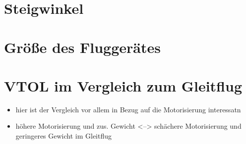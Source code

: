 \section{Steigwinkel}
\label{sec:steigwinkel}

\section{Größe des Fluggerätes}
\label{sec:groesse}

\section{VTOL im Vergleich zum Gleitflug}
\label{sec:vtol_vs_gleitflug}
\begin{itemize}
	\item hier ist der Vergleich vor allem in Bezug auf die Motorisierung interessatn
	\item höhere Motorisierung und zus. Gewicht <--> schächere Motorisierung und geringeres Gewicht im Gleitflug
\end{itemize}